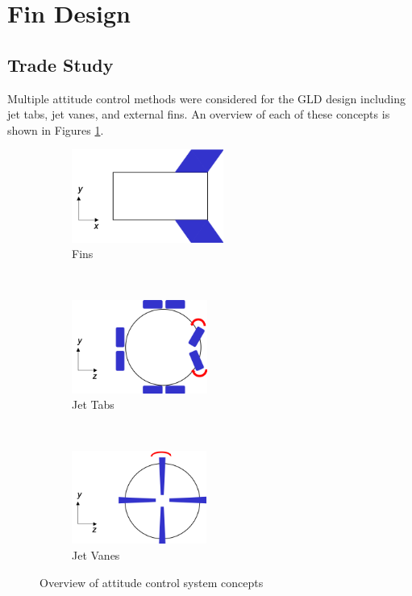\section{Fin Design}

\subsection{Trade Study}

Multiple attitude control methods were considered for the GLD design including jet tabs, jet vanes, and external fins. An overview of each of these concepts is shown in Figures \ref{fig:atitudectrl_conc}.

\begin{figure}[H]
    \centering
    \begin{subfigure}[b]{0.3\textwidth}
        \centering
        \includegraphics[height=1.2in]{AtitudeControl_Figures/fins.png}
        \caption{Fins}
    \end{subfigure}
    ~
    \begin{subfigure}[b]{0.3\textwidth}
        \centering
        \includegraphics[height=1.2in]{AtitudeControl_Figures/tabs.png}
        \caption{Jet Tabs}
    \end{subfigure}
    ~
    \begin{subfigure}[b]{0.3\textwidth}
        \centering
        \includegraphics[height=1.2in]{AtitudeControl_Figures/vanes.png}
        \caption{Jet Vanes}
    \end{subfigure}
    \caption{Overview of attitude control system concepts \label{fig:atitudectrl_conc}}
\end{figure}

